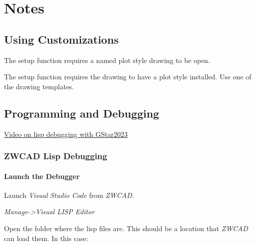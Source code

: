 
\chapter{Notes}
\section{Using Customizations}
\begin{bulletedlist}
	\item The setup function requires a named plot style drawing to be open.
	\item The setup function requires the drawing to have a plot style installed.  Use one of the drawing templates.
\end{bulletedlist}

\section{Programming and Debugging}
\begin{bulletedlist}
	\item \href{https://www.youtube.com/watch?v=Rrgx3TcXNzM}{Video on lisp debugging with GStar2023}
\end{bulletedlist}

\subsection{ZWCAD Lisp Debugging}
\subsubsection{Launch the Debugger}
\begin{numberedlist}
	\item Launch \emph{Visual Studio Code} from \emph{ZWCAD}.
	\begin{plainlist}
		\item \emph{Manage->Visual LISP Editor}
	\end{plainlist}
	\item Open the folder where the lisp files are.  This should be a location that \emph{ZWCAD} can load them.  In this case:
	\begin{plainlist}
		\item {}
	\end{plainlist}
\end{numberedlist}


